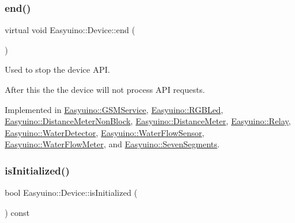 \mbox{\label{class_easyuino_1_1_device_ab31018ef64adc84aa2ea575b2297548f}} 
\subsubsection{\texorpdfstring{end()}{end()}}
{\footnotesize\ttfamily virtual void Easyuino\+::\+Device\+::end (\begin{DoxyParamCaption}{ }\end{DoxyParamCaption})\hspace{0.3cm}{\ttfamily [pure virtual]}}



Used to stop the device A\+PI. 

After this the the device will not process A\+PI requests. 

Implemented in \hyperlink{class_easyuino_1_1_g_s_m_service_a05bef783773776ec209608aa81d1ff45}{Easyuino\+::\+G\+S\+M\+Service}, \hyperlink{class_easyuino_1_1_r_g_b_led_ad0e9fb0da405c537e876c8a2dc22246e}{Easyuino\+::\+R\+G\+B\+Led}, \hyperlink{class_easyuino_1_1_distance_meter_non_block_a845d4db657ff408205d1cdb3c35982a4}{Easyuino\+::\+Distance\+Meter\+Non\+Block}, \hyperlink{class_easyuino_1_1_distance_meter_a8a818cc922418ae5a078193dbfab1e6b}{Easyuino\+::\+Distance\+Meter}, \hyperlink{class_easyuino_1_1_relay_a2b57237c996a6ffe8e900ae273bce9d4}{Easyuino\+::\+Relay}, \hyperlink{class_easyuino_1_1_water_detector_a9c1473536f47b2a7d8e1f8fb1bf5f3fd}{Easyuino\+::\+Water\+Detector}, \hyperlink{class_easyuino_1_1_water_flow_sensor_a7f31ac7735b049394d34cfbc37f17359}{Easyuino\+::\+Water\+Flow\+Sensor}, \hyperlink{class_easyuino_1_1_water_flow_meter_a47024d4da9568e42743a875c08c33121}{Easyuino\+::\+Water\+Flow\+Meter}, and \hyperlink{class_easyuino_1_1_seven_segments_afea49385382a7b9c597b4fe42a003fee}{Easyuino\+::\+Seven\+Segments}.

\mbox{\label{class_easyuino_1_1_device_a3761bc02cb81ca0833b535ecaf9a7659}} 
\subsubsection{\texorpdfstring{is\+Initialized()}{isInitialized()}}
{\footnotesize\ttfamily bool Easyuino\+::\+Device\+::is\+Initialized (\begin{DoxyParamCaption}{ }\end{DoxyParamCaption}) const}




